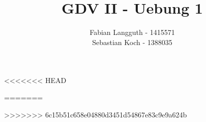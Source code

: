 \documentclass[a4paper,11pt]{scrartcl}
\title{GDV II - Uebung 1}
\author{Fabian Langguth - 1415571\\ Sebastian Koch - 1388035}
\newcommand{\vect}[1]{\ensuremath{\left( \begin{matrix}#1\end{matrix}\right)}}
\begin{document}
\maketitle
<<<<<<< HEAD


=======

\newcommand{\vect}[1]{\ensuremath{\left( \begin{matrix}#1\end{matrix}\right)}}





>>>>>>> 6c15b51c658e04880d3451d54867e83c9e9a624b

\end{document}
